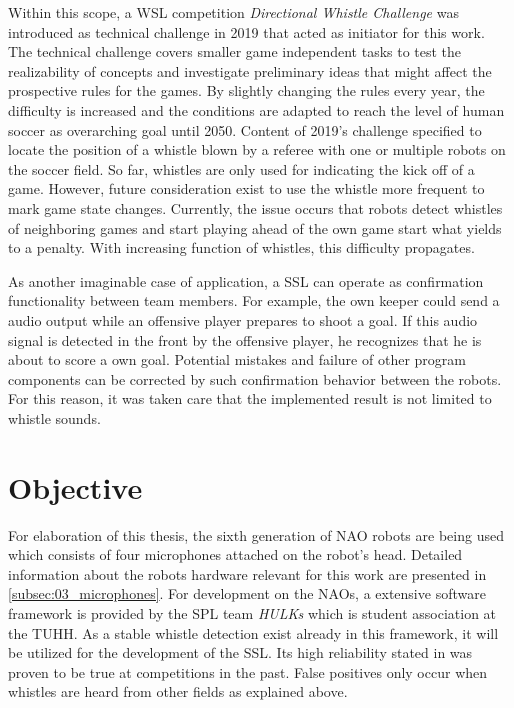 Within this scope, a \acf{WSL} competition \textit{Directional Whistle Challenge} was
introduced as technical challenge in 2019 that acted as initiator for this work.
The technical challenge covers smaller game independent tasks to test the realizability of
concepts and investigate preliminary ideas that might affect the prospective rules for the games.
By slightly changing the rules every year, the difficulty is increased and the conditions
are adapted to reach the level of human soccer as overarching goal until 2050.
Content of 2019's challenge specified to locate the position of a whistle blown by a referee
with one or multiple robots on the soccer field.
So far, whistles are only used for indicating the kick off of a game.
However, future consideration exist to use the whistle more frequent
to mark game state changes.
Currently, the issue occurs that robots detect whistles of neighboring
games and start playing ahead of the own game start what yields to a penalty.
With increasing function of whistles, this difficulty propagates.

As another imaginable case of application, a \ac{SSL} can operate as confirmation
functionality between team members.
For example, the own keeper could send a audio output while an offensive player prepares
to shoot a goal.
If this audio signal is detected in the front by the offensive player, he recognizes
that he is about to score a own goal.
Potential mistakes and failure of other program components can be corrected by such
confirmation behavior between the robots.
For this reason, it was taken care that the implemented result is not limited to
whistle sounds.

\section{Objective}
\label{sec:01_objective}

For elaboration of this thesis, the sixth generation of NAO robots are being used
which consists of four microphones attached on the robot's head.
Detailed information about the robots hardware relevant for this work are presented
in \cref{subsec:03_microphones}.
For development on the NAOs, a extensive software framework is provided by the
\ac{SPL} team \textit{HULKs} which is student association at the \ac{TUHH}.
As a stable whistle detection exist already in this framework,
it will be utilized for the development of the \ac{SSL}.
Its high reliability stated in \cite{Hasselbring} was proven to be true at
competitions in the past.
False positives only occur when whistles are heard from other fields as explained above.

